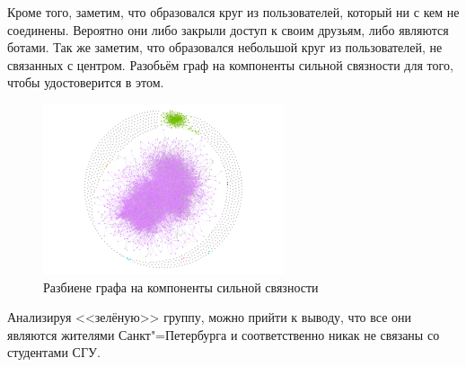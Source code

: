 Кроме того, заметим, что образовался круг из пользователей, который ни с кем не соединены. Вероятно они либо закрыли доступ к своим друзьям, либо являются ботами. Так же заметим, что образовался небольшой круг из пользователей, не связанных с центром. Разобьём граф на компоненты сильной связности для того, чтобы удостоверится в этом.
\begin{figure}[H]
    \centering
    \includegraphics[height = 5cm]{pictures/Strongly component.pdf}
    \caption{Разбиене графа на компоненты сильной связности}
    \label{fig:graph_strong_comp}
\end{figure}
Анализируя <<зелёную>> группу, можно прийти к выводу, что все они являются жителями Санкт"=Петербурга и соответственно никак не связаны со студентами СГУ.

